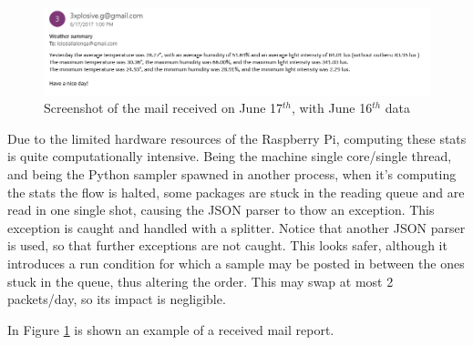 \documentclass[11pt]{article}
\begin{document}
\begin{figure}[h]
\includegraphics[width=\textwidth]{summary}
\caption{Screenshot of the mail received on June 17$^{th}$, with June 16$^{th}$ data}
\label{fig:summary}
\end{figure}

Due to the limited hardware resources of the Raspberry Pi, computing these stats is quite computationally intensive. Being the machine single core/single thread, and being the Python sampler spawned in another process, when it's computing the stats the flow is halted, some packages are stuck in the reading queue and are read in one single shot, causing the JSON parser to thow an exception. This exception is caught and handled with a splitter. Notice that another JSON parser is used, so that further exceptions are not caught. This looks safer, although it introduces a run condition for which a sample may be posted in between the ones stuck in the queue, thus altering the order. This may swap at most 2 packets/day, so its impact is negligible.

In Figure \ref{fig:summary} is shown an example of a received mail report.
\end{document}
